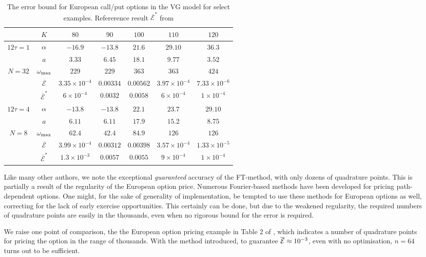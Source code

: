 \documentclass[11pt]{amsart}
\begin{document}
\begin{table}
\begin{center}\begin{tabular}{ccccccc}
\hline
 & $K$ & $80$ & $90$ & $100$ & $110$ & $120$\\
\hline
\multirow{2}{*}{$12 \tau=1$} & $\alpha$ & $ -16.9 $ & $ -13.8 $ & $ 21.6 $ & $ 29.10 $ & $ 36.3 $ \\ 
 & $a$ & $ 3.33 $ & $ 6.45 $ & $ 18.1 $ & $ 9.77 $ & $ 3.52 $ \\ 
\multirow{2}{*}{$N =32$} & $\omega_{\mathrm{\max}}$ & $ 229 $ & $ 229 $ & $ 363 $ & $ 363 $ & $ 424 $ \\ 
 & $\overline{\mathcal E}$ & $ 3.35 \times 10^{-4} $ & $ 0.00334 $ & $ 0.00562 $ & $ 3.97 \times 10^{-4} $ & $ 7.33 \times 10^{-6} $ \\ 
 & $\overline{\mathcal E}^*$ & $ 6 \times 10^{-4} $ & $ 0.0032 $ & $ 0.0058 $ & $ 6 \times 10^{-4} $ & $ 1 \times 10^{-4} $ \\ 
\hline
\multirow{2}{*}{$12 \tau=4$} & $\alpha$ & $ -13.8 $ & $ -13.8 $ & $ 22.1 $ & $ 23.7 $ & $ 29.10 $ \\ 
 & $a$ & $ 6.11 $ & $ 6.11 $ & $ 17.9 $ & $ 15.2 $ & $ 8.75 $ \\ 
\multirow{2}{*}{$N =8$} & $\omega_{\mathrm{\max}}$ & $ 62.4 $ & $ 42.4 $ & $ 84.9 $ & $ 126 $ & $ 126 $ \\ 
 & $\overline{\mathcal E}$ & $ 3.99 \times 10^{-4} $ & $ 0.00312 $ & $ 0.00398 $ & $ 3.57 \times 10^{-4} $ & $ 1.33 \times 10^{-5} $ \\ 
& $\overline{\mathcal E}^*$ & $ 1.3 \times 10^{-3} $ & $ 0.0057 $ & $ 0.0055 $ & $ 9 \times 10^{-4} $ & $ 1 \times 10^{-4} $ \\

\hline
\end{tabular}\end{center}
\caption{\label{tb:usvslee}The error bound for European call/put options in the VG model for select examples.
Refererence result $\overline{\mathcal E}^*$ from \cite{lee2004option}}
\end{table}

\begin{remark}
Like many other authors, we note the exceptional \emph{guaranteed} accuracy of the FT-method,
with only dozens of quadrature points. This is partially a result of the regularity of the European option price.
Numerous Fourier-based methods have been developed for pricing path-dependent options.
One might, for the sake of generality of implementation, 
be tempted to use these methods for European options as well, correcting for the lack of early exercise
opportunities. This certainly can be done, but due to the
weakened regularity, the required numbers of quadrature points are easily in the thousands, even when no rigorous
bound for the error is required.

We raise one point of comparison,
the the European option pricing example in Table 2 of \cite{jackson2008fourier},
which indicates a number of quadrature points for pricing the option in the range of thousands.
With the method introduced, to guarantee $\overline {\mathcal{E}} \approx 10^{-3}$,
even with no optimisation, $n=64$ turns out to be sufficient.
\end{remark}
\end{document}
